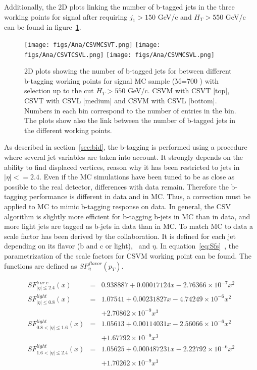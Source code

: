 Additionally, the 2D plots linking the number of b-tagged jets in the three working points for signal after requiring $j_{1}>150$ GeV/c and $H_{T}>550$ GeV/c can be found in figure~\ref{fig:WPcorr}.

\begin{figure}[!Hhtbp]
  \begin{center}
    \texttt{[image: figs/Ana/CSVMCSVT.png]}
    \texttt{[image: figs/Ana/CSVTCSVL.png]}
    \texttt{[image: figs/Ana/CSVMCSVL.png]}
    \caption{2D plots showing the number of b-tagged jets for between different b-tagging working points for signal MC sample (M=700 \GeVcc) with selection up to the cut $H_{T}>550$ GeV/c. CSVM with CSVT [top], CSVT with CSVL [medium] and CSVM with CSVL [bottom]. Numbers in each bin correspond to the number of entries in the bin. The plots show also the link between the number of b-tagged jets in the different working points.}
    \label{fig:WPcorr}
  \end{center}
\end{figure}

As described in section~\ref{sec:bid}, the b-tagging is performed using a procedure where several jet variables are taken into account. It strongly depends on the ability to find displaced vertices, reason why it has been restricted to jets in $|\eta|<=2.4$. Even if the MC simulations have been tuned to be as close as possible to the real detector, differences with data remain. Therefore the b-tagging performance is different in data and in MC. Thus, a correction must be applied to MC to mimic b-tagging response on data. In general, the CSV algorithm is slightly more efficient for b-tagging b-jets in MC than in data, and more light jets are tagged as b-jets in data than in MC. To match MC to data a scale factor has been derived by the collaboration. It is defined for each jet depending on its flavor (b and c or light), \pt~and $\eta$. In equation~\ref{eq:Sfs}~\cite{CMS-PAS-BTV-13-001}, the parametrization of the scale factors for CSVM working point can be found. The functions are defined as $SF^{flavor}_{\eta}(p_{T})$.

\begin{eqnarray}
  \label{eq:Sfs}
  SF^{b\; or\; c}_{|\eta|\le 2.4}(x) & = & 0.938887 + 0.00017124x - 2.76366 \times 10^{-7}x^{2} \nonumber \\
  SF^{light}_{|\eta|\le 0.8}(x) & = & 1.07541 + 0.00231827x - 4.74249 \times 10^{-6}x^{2}  \nonumber \\
  &  & +2.70862 \times 10^{-9}x^{3} \nonumber \\
  SF^{light}_{0.8 < |\eta|\le 1.6}(x) & = & 1.05613 + 0.00114031x - 2.56066 \times 10^{-6}x^{2} \nonumber \\
  &  & + 1.67792 \times 10^{-9}x^{3} \nonumber \\
  SF^{light}_{1.6 < |\eta|\le 2.4}(x) & = & 1.05625 + 0.000487231x - 2.22792 \times 10^{-6}x^{2} \nonumber \\
  &  & + 1.70262 \times 10^{-9}x^{3}
\end{eqnarray}

